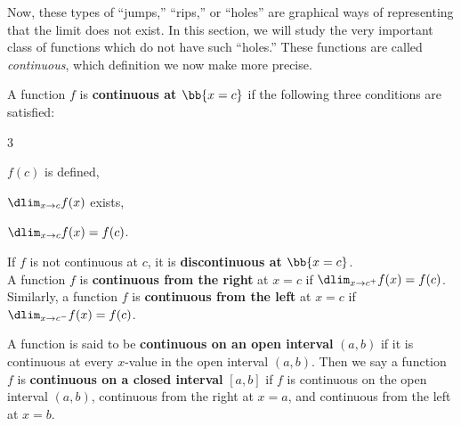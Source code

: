 \documentclass{book}
\begin{document}
Now, these types of ``jumps,'' ``rips,'' or ``holes'' are graphical ways of representing that the limit does not exist. In this section, we will study the very important class of functions which do not have such ``holes.'' These functions are called \emph{continuous}, which definition we now make more precise.

\begin{Def} A function $f$ is \textbf{continuous at $\bb{x=c}$ } if the following three conditions are satisfied:
\begin{enumerate}
\begin{multicols}{3}
\item $f(c)$ is defined,
\item $\dlim_{x\to c} f(x)$ exists,
\item $\dlim_{x\to c}f(x) = f(c)$.
\end{multicols}
\end{enumerate} If $f$ is not continuous at $c$, it is \textbf{discontinuous at $\bb{x=c}$}.\\

A function $f$ is \textbf{continuous from the right} at $x=c$ if $\dlim_{x\to c^+} f(x) = f(c)$. Similarly, a function $f$ is \textbf{continuous from the left} at $x=c$ if $\dlim_{x\to c^-} f(x) = f(c)$.\\
\end{Def}\vs
 
 \begin{Def}  A function is said to be \textbf{continuous on an open interval} $(a,b)$ if it is continuous at every $x$-value in the open interval $(a,b)$. Then we say a function $f$ is \textbf{continuous on a closed interval} $[a,b]$ if $f$ is continuous on the open interval $(a,b)$, continuous from the right at $x=a$, and continuous from the left at $x=b$.
\end{Def}\vs
\end{document}
